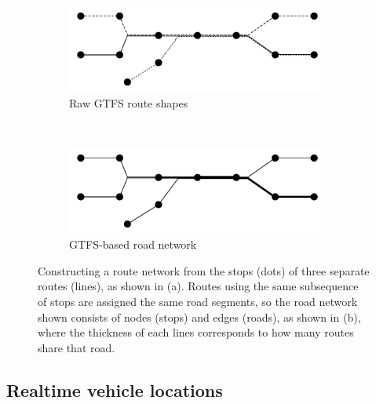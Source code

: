 \begin{figure}[tb]
    \centering
    \begin{subfigure}{0.7\textwidth}
        \centering
        \includegraphics[width=0.95\textwidth]{figures/02_network_segments_1.pdf}
        \caption{Raw GTFS route shapes}
        \label{fig:network_creation_1}
    \end{subfigure} \\
    \begin{subfigure}{0.7\textwidth}
        \centering
        \includegraphics[width=0.95\textwidth]{figures/02_network_segments_2.pdf}
        \caption{GTFS-based road network}
        \label{fig:network_creation_2}
    \end{subfigure}
    \caption{
        Constructing a route network from the stops (dots) of three separate
        routes (lines), as shown in (a).
        Routes using the same subsequence of stops are assigned the same
        road segments, so the road network shown 
        consists of nodes (stops) and edges (roads),
        as shown in (b), where the thickness of each lines
        corresponds to how many routes share that road.
    }
    \label{fig:network_creation}
\end{figure}


\subsection{Realtime vehicle locations}
\label{sec:realtime_data}

